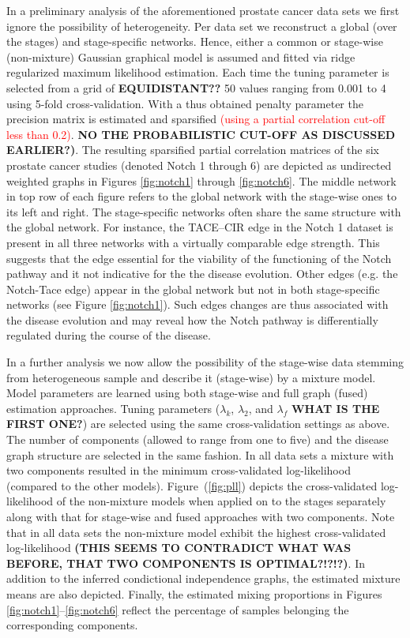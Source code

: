 \documentclass[10pt]{article}
\newcommand{\red}[1]{{\textcolor {red} {#1}}}
\begin{document}
In a preliminary analysis of the aforementioned prostate cancer data sets we first ignore the possibility of heterogeneity. Per data set we reconstruct a global (over the stages) and stage-specific networks. Hence, either a common or stage-wise (non-mixture) Gaussian graphical model is assumed and fitted via ridge regularized maximum likelihood estimation. Each time the tuning parameter is selected from a grid of \textbf{EQUIDISTANT??} 50 values ranging from 0.001 to 4 using 5-fold cross-validation. With a thus obtained penalty parameter the precision matrix is estimated and sparsified \red{(using a partial correlation cut-off less than 0.2)}. \textbf{NO THE PROBABILISTIC CUT-OFF AS DISCUSSED EARLIER?)}. The resulting sparsified partial correlation matrices of the six prostate cancer studies (denoted Notch 1 through 6) are depicted as undirected weighted graphs in Figures \ref{fig:notch1} through \ref{fig:notch6}. The middle network in top row of each figure refers to the global network with the stage-wise ones to its left and right. The stage-specific networks often share the same structure with the global network. For instance, the TACE--CIR edge in the Notch 1 dataset is present in all three networks with a virtually comparable edge strength. This suggests that the edge essential for the viability of the functioning of the Notch pathway and it not indicative for the the disease evolution. Other edges (e.g. the Notch-Tace edge) appear in the global network but not in both stage-specific networks (see Figure \ref{fig:notch1}). Such edges changes are thus associated with the disease evolution and may reveal how the Notch pathway is differentially regulated during the course of the disease. 


In a further analysis we now allow the possibility of the stage-wise data stemming from heterogeneous sample and describe it (stage-wise) by a mixture model. Model parameters are learned using both stage-wise and full graph (fused) estimation approaches. Tuning parameters ($\lambda_k$, $\lambda_2$, and $\lambda_f$ \textbf{WHAT IS THE FIRST ONE?}) are selected using the same cross-validation settings as above. The number of components (allowed to range from one to five) and the disease graph structure are selected in the same fashion. In all data sets a mixture with two components resulted in the minimum cross-validated log-likelihood (compared to the other models). Figure~(\ref{fig:pll}) depicts the cross-validated log-likelihood of the non-mixture models when applied on to the stages separately along with that for stage-wise and fused approaches with two components. Note that in all data sets the non-mixture model exhibit the highest cross-validated log-likelihood \textbf{(THIS SEEMS TO CONTRADICT WHAT WAS BEFORE, THAT TWO COMPONENTS IS OPTIMAL?!?!?)}. In addition to the inferred condictional independence graphs, the estimated mixture means are also depicted. Finally, the estimated mixing proportions in Figures \ref{fig:notch1}--\ref{fig:notch6} reflect the percentage of samples belonging the corresponding components. 
\end{document}
